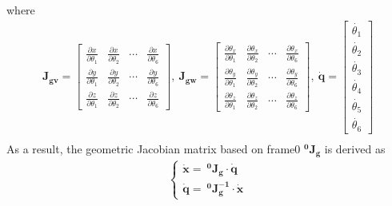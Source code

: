 where
\begin{equation*}
\begin{split}
\mathbf{J_{gv}} =
\begin{bmatrix}
\frac{\partial x}{\partial \theta _1}	&\frac{\partial x}{\partial \theta _2}	&\cdots		&\frac{\partial x}{\partial \theta _6}\\
\frac{\partial y}{\partial \theta _1}	&\frac{\partial y}{\partial \theta _2}	&\cdots		&\frac{\partial y}{\partial \theta _6}\\
\frac{\partial z}{\partial \theta _1}	&\frac{\partial z}{\partial \theta _2}	&\cdots		&\frac{\partial z}{\partial \theta _6}
\end{bmatrix}
,\ \mathbf{J_{gw}} = 
\begin{bmatrix}
\frac{\partial \theta _x}{\partial \theta _1}	&\frac{\partial \theta _x}{\partial \theta _2}	&\cdots		&\frac{\partial \theta _x}{\partial \theta _6}\\
\frac{\partial \theta _y}{\partial \theta _1}	&\frac{\partial \theta _y}{\partial \theta _2}	&\cdots		&\frac{\partial \theta _y}{\partial \theta _6}\\
\frac{\partial \theta _z}{\partial \theta _1}	&\frac{\partial \theta _z}{\partial \theta _2}	&\cdots		&\frac{\partial \theta _z}{\partial \theta _6}
\end{bmatrix} 
,\ \boldsymbol{\dot{q}}
=
\begin{bmatrix}
\dot{\theta _1} \\ 
\dot{\theta _2} \\ 
\dot{\theta _3} \\ 
\dot{\theta _4} \\ 
\dot{\theta _5} \\ 
\dot{\theta _6} 
\end{bmatrix}\\
\end{split}
\end{equation*}
As a result, the geometric Jacobian matrix based on frame{0} $\mathbf{^0J_g}$ is derived as
\begin{equation}
\label{eq:jg0}
\begin{split}
\left\{\begin{matrix}
\boldsymbol{\dot{x}} = \ \mathbf{^0\!J_g} \cdot \boldsymbol{\dot{q}}
\\ 
\boldsymbol{\dot{q}} = \ \mathbf{^0\!J_g^{-1}} \cdot \boldsymbol{\dot{x}}
\end{matrix}\right.	
\end{split}
\end{equation}
